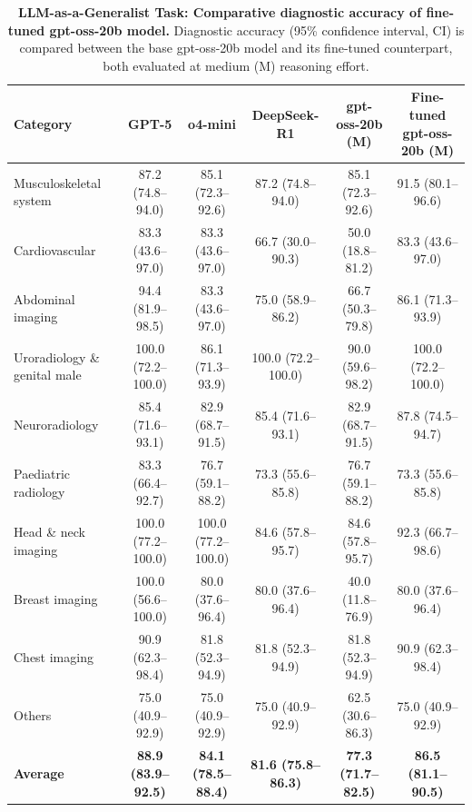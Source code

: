\documentclass[10pt,journal,compsoc, onecolumn]{IEEEtran}
\begin{document}
\begin{table}
\centering
\scriptsize
\setlength{\tabcolsep}{3pt}
\caption{\textbf{LLM-as-a-Generalist Task: Comparative diagnostic accuracy of fine-tuned gpt-oss-20b model.} 
Diagnostic accuracy (95\% confidence interval, CI) is compared between the base gpt-oss-20b model and its fine-tuned counterpart, both evaluated at medium (M) reasoning effort. 
}
\label{tab:adaptation_comparison}
\begin{tabular}{l *{5}{c}}
\toprule
\textbf{Category} &
\textbf{GPT-5} &
\textbf{o4-mini} &
\textbf{DeepSeek-R1} &
\textbf{gpt-oss-20b (M)} &
\textbf{Fine-tuned gpt-oss-20b (M)} \\
\midrule
Musculoskeletal system        & 87.2 (74.8--94.0) & 85.1 (72.3--92.6) & 87.2 (74.8--94.0) & 85.1 (72.3--92.6) & 91.5 (80.1--96.6) \\
Cardiovascular                & 83.3 (43.6--97.0) & 83.3 (43.6--97.0) & 66.7 (30.0--90.3) & 50.0 (18.8--81.2) & 83.3 (43.6--97.0) \\
Abdominal imaging             & 94.4 (81.9--98.5) & 83.3 (43.6--97.0) & 75.0 (58.9--86.2) & 66.7 (50.3--79.8) & 86.1 (71.3--93.9) \\
Uroradiology \& genital male
                              & 100.0 (72.2--100.0) & 86.1 (71.3--93.9) & 100.0 (72.2--100.0) & 90.0 (59.6--98.2) & 100.0 (72.2--100.0) \\
Neuroradiology                & 85.4 (71.6--93.1) & 82.9 (68.7--91.5) & 85.4 (71.6--93.1) & 82.9 (68.7--91.5) & 87.8 (74.5--94.7) \\
Paediatric radiology          & 83.3 (66.4--92.7) & 76.7 (59.1--88.2) & 73.3 (55.6--85.8) & 76.7 (59.1--88.2) & 73.3 (55.6--85.8) \\
Head \& neck imaging          & 100.0 (77.2--100.0) & 100.0 (77.2--100.0) & 84.6 (57.8--95.7) & 84.6 (57.8--95.7) & 92.3 (66.7--98.6) \\
Breast imaging                & 100.0 (56.6--100.0) & 80.0 (37.6--96.4) & 80.0 (37.6--96.4) & 40.0 (11.8--76.9) & 80.0 (37.6--96.4) \\
Chest imaging                 & 90.9 (62.3--98.4) & 81.8 (52.3--94.9) & 81.8 (52.3--94.9) & 81.8 (52.3--94.9) & 90.9 (62.3--98.4) \\
Others                        & 75.0 (40.9--92.9) & 75.0 (40.9--92.9) & 75.0 (40.9--92.9) & 62.5 (30.6--86.3) & 75.0 (40.9--92.9) \\
\midrule
\textbf{Average}              & \textbf{88.9 (83.9--92.5)} &
\textbf{84.1 (78.5--88.4)} &
\textbf{81.6 (75.8--86.3)} &
\textbf{77.3 (71.7--82.5)} &
\textbf{86.5 (81.1--90.5)} \\
\bottomrule
\end{tabular}
\end{table}
\end{document}
